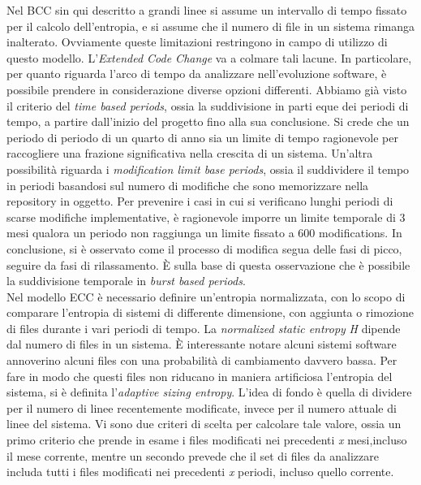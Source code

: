 Nel BCC sin qui descritto a grandi linee si assume un intervallo di tempo fissato per il calcolo dell'entropia, e si assume che il numero di file in un sistema rimanga inalterato. Ovviamente queste limitazioni restringono in campo di utilizzo di questo modello. L'\textit{Extended Code Change} va a colmare tali lacune. In particolare, per quanto riguarda l'arco di tempo da analizzare nell'evoluzione software, è possibile prendere in considerazione diverse opzioni differenti. Abbiamo già visto il criterio del \textit{time based periods}, ossia la suddivisione in parti eque dei periodi di tempo, a partire dall'inizio del progetto fino alla sua conclusione. Si crede che un periodo di periodo di un quarto di anno sia un limite di tempo ragionevole per raccogliere una frazione significativa nella crescita di un sistema. Un'altra possibilità riguarda i \textit{modification limit base periods}, ossia il suddividere il tempo in periodi basandosi sul numero di modifiche che sono memorizzare nella repository in oggetto. Per prevenire i casi in cui si verificano lunghi periodi di scarse modifiche implementative, è ragionevole imporre un limite temporale di 3 mesi qualora un periodo non raggiunga un limite fissato a 600 modifications. In conclusione, si è osservato come il processo di modifica segua delle fasi di picco, seguire da fasi di rilassamento. È sulla base di questa osservazione che è possibile la suddivisione temporale in \textit{burst based periods}.\\

Nel modello ECC è necessario definire un'entropia normalizzata, con lo scopo di comparare l'entropia di sistemi di differente dimensione, con aggiunta o rimozione di files durante i vari periodi di tempo. La \textit{normalized static entropy} \textit{H} dipende dal numero di files in un sistema. È interessante notare alcuni sistemi software annoverino alcuni files con una probabilità di cambiamento davvero bassa. Per fare in modo che questi files non riducano in maniera artificiosa l'entropia del sistema, si è definita l'\textit{adaptive sizing entropy}. L'idea di fondo è quella di dividere per il numero di linee recentemente modificate, invece per il numero attuale di linee del sistema. Vi sono due criteri di scelta per calcolare tale valore, ossia un primo criterio che prende in esame i files modificati nei precedenti \textit{x} mesi,incluso il mese corrente, mentre un secondo prevede che il set di files da analizzare includa tutti i files modificati nei precedenti \textit{x} periodi, incluso quello corrente. 